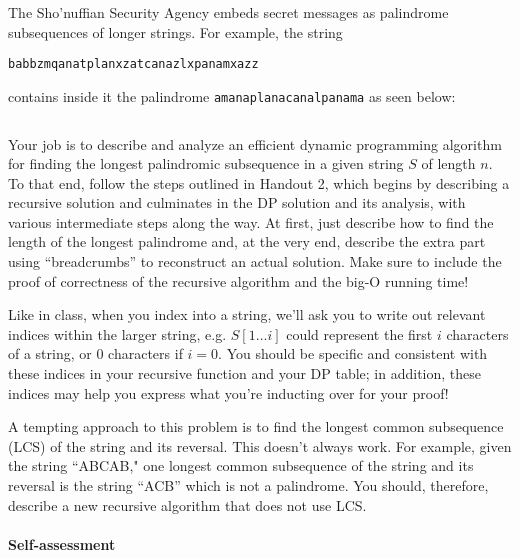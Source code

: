 \documentclass{ks-pset}
\begin{document}
\begin{problem}

  The Sho'nuffian Security Agency embeds secret messages as palindrome
  subsequences of longer strings.  For example, the string

  \texttt{babbzmqanatplanxzatcanazlxpanamxazz}

  contains inside it the palindrome \texttt{amanaplanacanalpanama} as
  seen below:

  \inputminted{text}{palindrome.txt}

  Your job is to describe and analyze an efficient dynamic programming
  algorithm for finding the longest palindromic subsequence in a given string
  \(S\) of length \(n\). To that end, follow the steps outlined in Handout 2, which
  begins by describing a recursive solution and culminates in the DP solution
  and its analysis, with various intermediate steps along the way. At first,
  just describe how to find the length of the longest palindrome and, at the
  very end, describe the extra part using ``breadcrumbs'' to reconstruct an
  actual solution. Make sure to include the proof of correctness of the
  recursive algorithm and the big-O running time!

  \begin{note}
    Like in class, when you index into a string, we'll ask you to write out
    relevant indices within the larger string, e.g. \(S[1 \dotso i]\) could
    represent the first \(i\) characters of a string, or 0 characters if \(i =
    0\). You should be specific and consistent with these indices in your
    recursive function and your DP table; in addition, these indices may help
    you express what you're inducting over for your proof!
  \end{note}

  \begin{note}
    A tempting approach to this problem is to find the longest common
    subsequence (LCS) of the string and its reversal.  This doesn't always
    work.  For example, given the string ``ABCAB," one longest common
    subsequence of the string and its reversal is the string ``ACB'' which is
    not a palindrome.  You should, therefore, describe a new recursive
    algorithm that does not use LCS.
  \end{note}

\end{problem}

\begin{solution}
  \paragraph{Self-assessment}
\end{solution}
\end{document}
